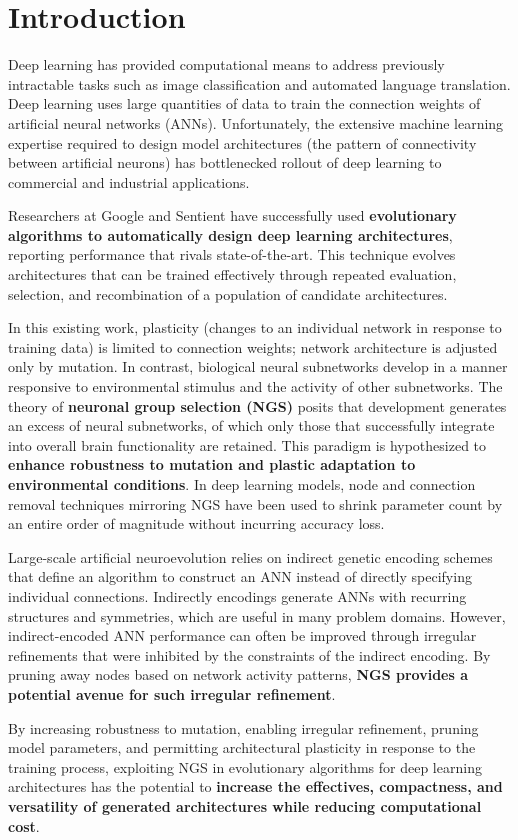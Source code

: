 \section{Introduction}

Deep learning has provided computational means to address previously intractable tasks such as image classification and automated language translation.
Deep learning uses large quantities of data to train the connection weights of artificial neural networks (ANNs).
Unfortunately, the extensive machine learning expertise required to design model architectures (the pattern of connectivity between artificial neurons) has bottlenecked rollout of deep learning to commercial and industrial applications.

Researchers at Google\autocite{real2017large} and Sentient\autocite{miikkulainen2017evolving} have successfully used \textbf{evolutionary algorithms to automatically design deep learning architectures}, reporting performance that rivals state-of-the-art.
This technique evolves architectures that can be trained effectively through repeated evaluation, selection, and recombination of a population of candidate architectures.

In this existing work, plasticity (changes to an individual network in response to training data) is limited to connection weights;
network architecture is adjusted only by mutation.
In contrast, biological neural subnetworks develop in a manner responsive to environmental stimulus and the activity of other subnetworks.
The theory of \textbf{neuronal group selection (NGS)} posits that development generates an excess of neural subnetworks, of which only those that successfully integrate into overall brain functionality are retained.\autocite{sanes2011development}
This paradigm is hypothesized to \textbf{enhance robustness to mutation and plastic adaptation to environmental conditions}.\autocite{downing2015intelligence}
In deep learning models, node and connection removal techniques mirroring NGS have been used to shrink parameter count by an entire order of magnitude without incurring accuracy loss.\autocite{song2015learning}

Large-scale artificial neuroevolution relies on indirect genetic encoding schemes that define an algorithm to construct an ANN instead of directly specifying individual connections.
Indirectly encodings generate ANNs with recurring structures and symmetries, which are useful in many problem domains.
However, indirect-encoded ANN performance can often be improved through irregular refinements that were inhibited by the constraints of the indirect encoding.\autocite{clune2011performance}
By pruning away nodes based on network activity patterns, \textbf{NGS provides a potential avenue for such irregular refinement}.

By increasing robustness to mutation, enabling irregular refinement, pruning model parameters, and permitting architectural plasticity in response to the training process, exploiting NGS in evolutionary algorithms for deep learning architectures has the potential to \textbf{increase the effectives, compactness, and versatility of generated architectures while reducing computational cost}.
